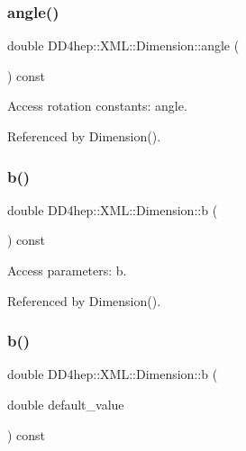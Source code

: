 \subsubsection{\texorpdfstring{angle()}{angle()}}
{\footnotesize\ttfamily double D\+D4hep\+::\+X\+M\+L\+::\+Dimension\+::angle (\begin{DoxyParamCaption}{ }\end{DoxyParamCaption}) const}



Access rotation constants\+: angle. 



Referenced by Dimension().

\hypertarget{struct_d_d4hep_1_1_x_m_l_1_1_dimension_ae755aaabfb6865b8a0833499d3abbd4f}{}\label{struct_d_d4hep_1_1_x_m_l_1_1_dimension_ae755aaabfb6865b8a0833499d3abbd4f} 
\subsubsection{\texorpdfstring{b()}{b()}\hspace{0.1cm}{\footnotesize\ttfamily [1/2]}}
{\footnotesize\ttfamily double D\+D4hep\+::\+X\+M\+L\+::\+Dimension\+::b (\begin{DoxyParamCaption}{ }\end{DoxyParamCaption}) const}



Access parameters\+: b. 



Referenced by Dimension().

\hypertarget{struct_d_d4hep_1_1_x_m_l_1_1_dimension_a7069a933c0f0b87afc1cc73a10aec750}{}\label{struct_d_d4hep_1_1_x_m_l_1_1_dimension_a7069a933c0f0b87afc1cc73a10aec750} 
\subsubsection{\texorpdfstring{b()}{b()}\hspace{0.1cm}{\footnotesize\ttfamily [2/2]}}
{\footnotesize\ttfamily double D\+D4hep\+::\+X\+M\+L\+::\+Dimension\+::b (\begin{DoxyParamCaption}\item[{double}]{default\+\_\+value }\end{DoxyParamCaption}) const}



